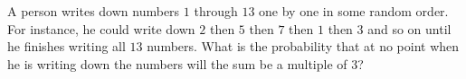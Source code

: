 A person writes down numbers $1$ through $13$ one by one in some random order. For instance, he could write down $2$ then $5$ then $7$ then $1$ then $3$ and so on until he finishes writing all $13$ numbers. What is the probability that at no point when he is writing down the numbers will the sum be a multiple of $3$?
